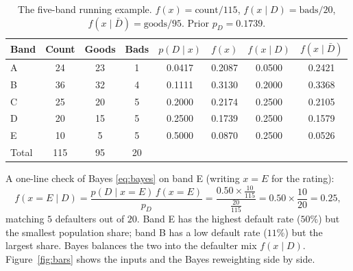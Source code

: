 \documentclass[12pt]{article}
\newcommand{\pD}{p_D}
\newcommand{\PDx}{p(D \mid x)}
\begin{document}
\begin{table}[htbp]
\centering
\small
\begin{tabular}{l S[table-format=3.0] S[table-format=2.0] S[table-format=2.0]
  S[table-format=1.4] S[table-format=1.4] S[table-format=1.4] S[table-format=1.4]}
\toprule
Band & {Count} & {Goods} & {Bads} & {$\PDx$} & {$f(x)$} & {$f(x\mid D)$} & {$f(x\mid\bar D)$}\\
\midrule
A & 24 & 23 & 1 & 0.0417 & 0.2087 & 0.0500 & 0.2421 \\
B & 36 & 32 & 4 & 0.1111 & 0.3130 & 0.2000 & 0.3368 \\
C & 25 & 20 & 5 & 0.2000 & 0.2174 & 0.2500 & 0.2105 \\
D & 20 & 15 & 5 & 0.2500 & 0.1739 & 0.2500 & 0.1579 \\
E & 10 &  5 & 5 & 0.5000 & 0.0870 & 0.2500 & 0.0526 \\
\midrule
Total & 115 & 95 & 20 & & & & \\
\bottomrule
\end{tabular}
\caption{The five-band running example. $f(x)=\text{count}/115$, $f(x\mid D)=\text{bads}/20$,
$f(x\mid\bar D)=\text{goods}/95$. Prior $\pD=0.1739$.}
\label{tab:data}
\end{table}

A one-line check of Bayes \eqref{eq:bayes} on band E (writing $x{=}E$ for the rating):
\begin{equation}
f(x{=}E\mid D)=\frac{p(D\mid x{=}E)\,f(x{=}E)}{\pD}
=\frac{0.50\times \tfrac{10}{115}}{\tfrac{20}{115}}
=0.50\times\frac{10}{20}=0.25,
\end{equation}
matching $5$ defaulters out of $20$. Band E has the highest default rate ($50\%$) but the
smallest population share; band B has a low default rate ($11\%$) but the largest share. Bayes
balances the two into the defaulter mix $f(x\mid D)$. Figure~\ref{fig:bars} shows the inputs
and the Bayes reweighting side by side.
\end{document}
